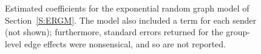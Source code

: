 \documentclass[final]{statsoc}
\begin{document}
\begin{figure}
\subfloat[Network effects]{ %
  \centering
  \begin{tabular}{lrrr}
  \toprule
  Variate
  & \texttt{mutual}
  & \texttt{ctriple}
  & \texttt{ttriple}
  \\
  \midrule
  Coefficient
  & 4.49
  & \textcolor{LightGray}{0.15}
  & 0.42
  \\
  (SE)
  & \tiny{(0.003)}
  & \textcolor{LightGray}{\tiny{(0.290)}}
  & \tiny{(0.060)}
  \\
  \bottomrule
  \end{tabular}
}
\caption{Estimated coefficients for the exponential random graph model of Section~\ref{S:ERGM}.  The model also included a term for each sender (not shown); furthermore, standard errors returned for the group-level edge effects were nonsensical, and so are not reported.
}
\end{figure}




\end{document}
